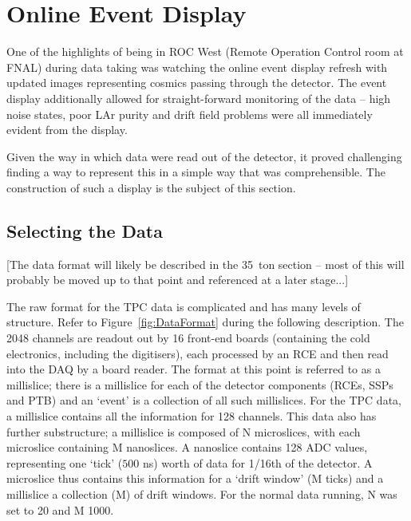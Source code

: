 \section{Online Event Display}\label{sec:EventDisplay}

One of the highlights of being in ROC West (Remote Operation Control room at FNAL) during data taking was watching the online event display refresh with updated images representing cosmics passing through the detector.  The event display additionally allowed for straight-forward monitoring of the data -- high noise states, poor LAr purity and drift field problems were all immediately evident from the display.

Given the way in which data were read out of the detector, it proved challenging finding a way to represent this in a simple way that was comprehensible.  The construction of such a display is the subject of this section.

\subsection{Selecting the Data}\label{sec:SelectingEVDData}

[The data format will likely be described in the 35~ton section -- most of this will probably be moved up to that point and referenced at a later stage...]

The raw format for the TPC data is complicated and has many levels of structure.  Refer to Figure~\ref{fig:DataFormat} during the following description.  The 2048 channels are readout out by 16 front-end boards (containing the cold electronics, including the digitisers), each processed by an RCE and then read into the DAQ by a board reader.  The format at this point is referred to as a millislice; there is a millislice for each of the detector components (RCEs, SSPs and PTB) and an `event' is a collection of all such millislices.  For the TPC data, a millislice contains all the information for 128 channels.  This data also has further substructure; a millislice is composed of N microslices, with each microslice containing M nanoslices.  A nanoslice contains 128 ADC values, representing one `tick' ($500$ ns) worth of data for 1/16th of the detector.  A microslice thus contains this information for a `drift window' (M ticks) and a millislice a collection (M) of drift windows.  For the normal data running, N was set to 20 and M 1000.

